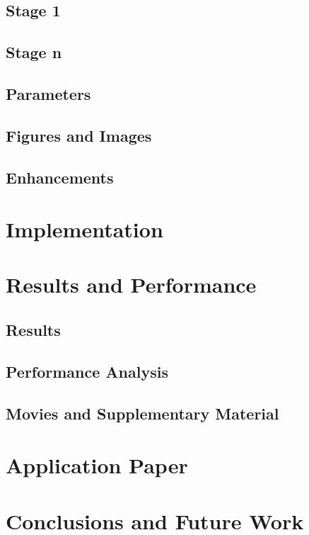 \documentclass[journal]{vgtc}                %
\begin{document}
\subsection{Stage 1}
\subsection{Stage n}
\subsection{Parameters}
\subsection{Figures and Images}
\subsection{Enhancements}
\section{Implementation}
\section{Results and Performance}
\subsection{Results}
\subsection{Performance Analysis}
\subsection{Movies and Supplementary Material}
\section{Application Paper}
\section{Conclusions and Future Work}

\newpage


\end{document}
